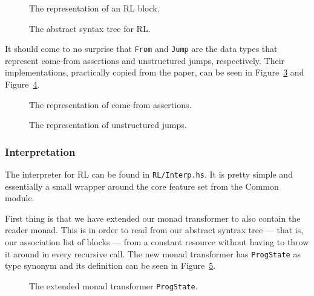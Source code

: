  \begin{figure}[h]
  
  \caption{The representation of an RL block.}\label{fig:rlblock}
\end{figure}

\begin{figure}[h]
  
  \caption{The abstract syntax tree for RL.}\label{fig:rlast}
\end{figure}

\noindent It should come to no surprise that \texttt{From} and \texttt{Jump} are the data types that represent come-from assertions and unstructured jumps, respectively. Their implementations, practically copied from the paper, can be seen in Figure~\ref{fig:from} and Figure~\ref{fig:jump}.

\begin{figure}[h]
  
  \caption{The representation of come-from assertions.}\label{fig:from}
\end{figure}

\begin{figure}[H]
  
  \caption{The representation of unstructured jumps.}\label{fig:jump}
\end{figure}

\subsubsection{Interpretation}
The interpreter for RL can be found in \texttt{RL/Interp.hs}. It is pretty simple and essentially a small wrapper around the core feature set from the Common module.

First thing is that we have extended our monad transformer to also contain the reader monad. This is in order to read from our abstract syntrax tree --- that is, our association list of blocks --- from a constant resource without having to throw it around in every recursive call. The new monad transformer has \texttt{ProgState} as type synonym and its definition can be seen in Figure~\ref{fig:progstate}.

\begin{figure}[h]
  
  \caption{The extended monad transformer \texttt{ProgState}.}\label{fig:progstate}
\end{figure}

